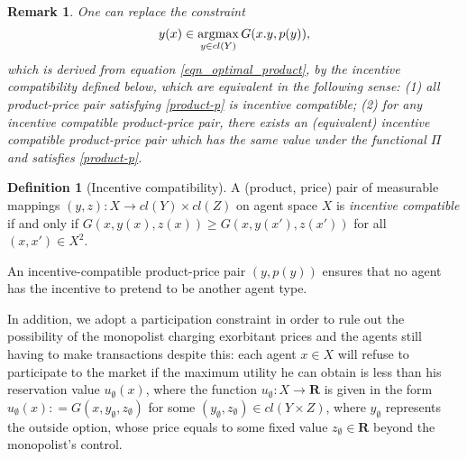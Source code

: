 \documentclass[a4paper, 11pt]{amsart}
\numberwithin{equation}{section}
\theoremstyle{plain}
\newtheorem{remark}[theorem]{Remark}
\theoremstyle{definition}
\newtheorem{definition}[theorem]{Definition}
\theoremstyle{remark}
\newcommand{\R}{\mathbf{R}}
\newcommand{\argmax}{\operatornamewithlimits{argmax}}
\begin{document}
{
\begin{remark}
One can replace the constraint
\begin{equation}\label{product-p}
	y(x)\in \argmax_{y\in cl(Y)} G(x.y, p(y)),
\end{equation}
which is derived from equation \eqref{eqn_optimal_product}, by the incentive compatibility defined below, which are equivalent in the following sense: (1) all product-price pair satisfying \eqref{product-p} is incentive compatible; (2) for any incentive compatible product-price pair, there exists an (equivalent)  incentive compatible product-price pair which has the same value under the functional $\Pi$ and satisfies \eqref{product-p}.
\end{remark}
}


\begin{definition}[Incentive compatibility]
	A (product, price) pair of measurable mappings $(y,z): X \rightarrow cl(Y) \times cl(Z)$ on agent space $X$ is \textit{incentive compatible} if and only if $G(x,y(x),z(x)) \ge G(x, y(x'), z(x'))$ for all $(x,x')\in X^2$.
\end{definition}

An incentive-compatible product-price pair $(y, p(y))$ ensures that no agent has the incentive to pretend to be another agent type.\medskip 


In addition, we adopt a participation constraint in order to rule out the possibility of the monopolist charging exorbitant prices and the agents still having to make transactions despite this: each agent $x\in X$ will refuse to participate to the market if the maximum utility he can obtain %
is less than %
his reservation value $u_{\emptyset}(x)$, where the function $u_{\emptyset}: X \rightarrow \R$ is given in the form $u_{\emptyset}(x): = G(x, y_{\emptyset}, z_{\emptyset})$ for some $(y_{\emptyset}, z_{\emptyset}) \in cl(Y \times Z)$, where $y_{\emptyset}$ represents the outside option, whose price equals to some fixed value $z_{\emptyset} \in \R$ beyond the monopolist's control. \medskip
\end{document}
